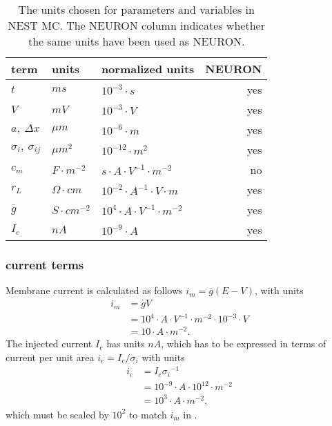\begin{table}[hp!]
\begin{tabular}{lllr}
    \hline
    term                      &   units                 &  normalized units                         & NEURON \\
    \hline
    $t$                       &   $ms$                  &  $10^{-3} \cdot s$                        & yes    \\
    $V$                       &   $mV$                  &  $10^{-3} \cdot V$                        & yes    \\
    $a,~\Delta x$             &   $\mu m$               &  $10^{-6} \cdot m$                        & yes    \\
    $\sigma_{i},~\sigma_{ij}$ &   $\mu m^2$             &  $10^{-12} \cdot m^2$                     & yes    \\
    $c_m$                     &   $F\cdot m^{-2}$       &  $s\cdot A\cdot V^{-1}\cdot m^{-2}$       & no     \\
    $r_L$                     &   $\Omega\cdot cm$ &    $  10^{-2} \cdot A^{-1}\cdot V\cdot m$      & yes    \\
    $\overline{g}$            &   $S\cdot cm^{-2}$      &  $10^{4} \cdot A\cdot V^{-1}\cdot m^{-2}$ & yes    \\
    $I_e$                     &   $nA$                  &  $10^{-9} \cdot A$                        & yes    \\
    \hline
\end{tabular}
\caption{The units chosen for parameters and variables in NEST MC. The NEURON column indicates whether the same units have been used as NEURON.}
\label{tbl:units}
\end{table}

\subsubsection{current terms}
Membrane current is calculated as follows $i_m = \overline{g}(E-V)$, with units
\begin{align}
    \unit{ i_m } &=  \unit{ \overline{g} } \unit{ V } \nonumber \\
                       &=  10^{4} \cdot A\cdot V^{-1}\cdot m^{-2} \cdot 10^{-3} \cdot V \nonumber \\
                       &=  10 \cdot A \cdot m^{-2}. \label{eq:im_unit}
\end{align}
The injected current $I_e$ has units $nA$, which has to be expressed in terms of current per unit area $i_e=I_e / \sigma_i$ with units
\begin{align}
    \unit{ i_e } &=  \unit{ I_e } \unit{ \sigma_i }^{-1} \nonumber \\
                       &=  10^{-9}\cdot A \cdot 10^{12} \cdot m^{-2} \nonumber \\
                       &=  10^{3} \cdot A \cdot m ^{-2}, \label{eq:ie_unit}
\end{align}
which must be scaled by $10^2$ to match $i_m$ in .

